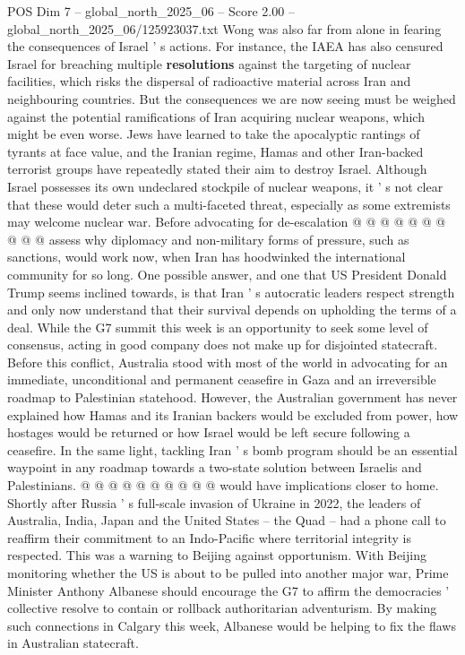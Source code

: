 \begin{textsample}{POS Dim 7 – global\_north\_2025\_06 – Score 2.00 – global\_north\_2025\_06/125923037.txt}
Wong was also far from alone in fearing the consequences of Israel ' s actions.
For instance, the IAEA has also censured Israel for breaching multiple \textbf{resolutions} against the targeting of nuclear facilities, which risks the dispersal of radioactive material across Iran and neighbouring countries.
But the consequences we are now seeing must be weighed against the potential ramifications of Iran acquiring nuclear weapons, which might be even worse.
Jews have learned to take the apocalyptic rantings of tyrants at face value, and the Iranian regime, Hamas and other Iran-backed terrorist groups have repeatedly stated their aim to destroy Israel.
Although Israel possesses its own undeclared stockpile of nuclear weapons, it ' s not clear that these would deter such a multi-faceted threat, especially as some extremists may welcome nuclear war.
Before advocating for de-escalation @ @ @ @ @ @ @ @ @ @ assess why diplomacy and non-military forms of pressure, such as sanctions, would work now, when Iran has hoodwinked the international community for so long.
One possible answer, and one that US President Donald Trump seems inclined towards, is that Iran ' s autocratic leaders respect strength and only now understand that their survival depends on upholding the terms of a deal.
While the G7 summit this week is an opportunity to seek some level of consensus, acting in good company does not make up for disjointed statecraft.
Before this conflict, Australia stood with most of the world in advocating for an immediate, unconditional and permanent ceasefire in Gaza and an irreversible roadmap to Palestinian statehood.
However, the Australian government has never explained how Hamas and its Iranian backers would be excluded from power, how hostages would be returned or how Israel would be left secure following a ceasefire.
In the same light, tackling Iran ' s bomb program should be an essential waypoint in any roadmap towards a two-state solution between Israelis and Palestinians. @ @ @ @ @ @ @ @ @ @ would have implications closer to home.
Shortly after Russia ' s full-scale invasion of Ukraine in 2022, the leaders of Australia, India, Japan and the United States -- the Quad -- had a phone call to reaffirm their commitment to an Indo-Pacific where territorial integrity is respected.
This was a warning to Beijing against opportunism.
With Beijing monitoring whether the US is about to be pulled into another major war, Prime Minister Anthony Albanese should encourage the G7 to affirm the democracies ' collective resolve to contain or rollback authoritarian adventurism.
By making such connections in Calgary this week, Albanese would be helping to fix the flaws in Australian statecraft.

\end{textsample}
